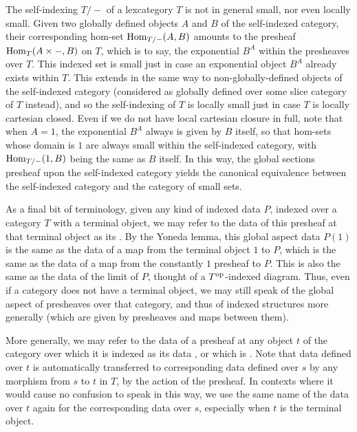 The self-indexing $T/-$ of a lexcategory $T$ is not in general small, nor even locally small. Given two globally defined objects $A$ and $B$ of the self-indexed category, their corresponding hom-set $\operatorname{Hom}_{T/-}(A, B)$ amounts to the presheaf $\operatorname{Hom}_{T}(A \times -, B)$ on $T$, which is to say, the exponential $B^A$ within the presheaves over $T$. This indexed set is small just in case an exponential object $B^A$ already exists within $T$. This extends in the same way to non-globally-defined objects of the self-indexed category (considered as globally defined over some slice category of $T$ instead), and so the self-indexing of $T$ is locally small just in case $T$ is locally cartesian closed. Even if we do not have local cartesian closure in full, note that when $A = 1$, the exponential $B^A$ always is given by $B$ itself, so that hom-sets whose domain is $1$ are always small within the self-indexed category, with $\operatorname{Hom}_{T/-}(1, B)$ being the same as $B$ itself. In this way, the global sections presheaf upon the self-indexed category yields the canonical equivalence between the self-indexed category and the category of small sets.

As a final bit of terminology, given any kind of indexed data $P$, indexed over a category $T$ with a terminal object, we may refer to the data of this presheaf at that terminal object as its . By the Yoneda lemma, this global aspect data $P(1)$ is the same as the data of a map from the terminal object $1$ to $P$, which is the same as the data of a map from the constantly $1$ presheaf to $P$. This is also the same as the data of the limit of $P$, thought of a $T^{\mathrm{op}}$-indexed diagram. Thus, even if a category does not have a terminal object, we may still speak of the global aspect of presheaves over that category, and thus of indexed structures more generally (which are given by presheaves and maps between them).


More generally, we may refer to the data of a presheaf at any object $t$ of the category over which it is indexed as its data , or which is . Note that data defined over $t$ is automatically transferred to corresponding data defined over $s$ by any morphism from $s$ to $t$ in $T$, by the action of the presheaf. In contexts where it would cause no confusion to speak in this way, we use the same name of the data over $t$ again for the corresponding data over $s$, especially when $t$ is the terminal object. 

